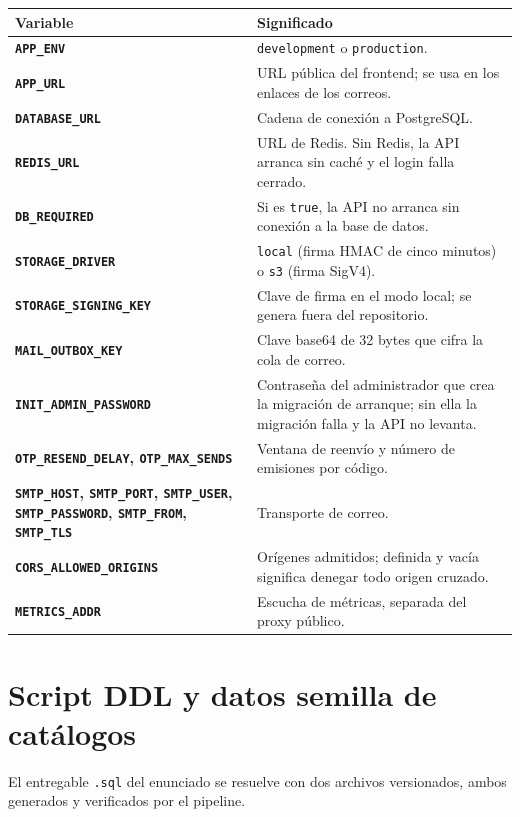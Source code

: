 \documentclass[11pt,a4paper]{article}
\newcommand{\code}[1]{\texttt{#1}}
\begin{document}
\begin{center}
\small
\begin{tabularx}{\textwidth}{@{}>{\bfseries\color{upseAzul}}p{4.8cm} X@{}}
\toprule
Variable & Significado \\
\midrule
\code{APP\_ENV} & \code{development} o \code{production}. \\
\code{APP\_URL} & URL p\'ublica del frontend; se usa en los enlaces de los correos. \\
\code{DATABASE\_URL} & Cadena de conexi\'on a PostgreSQL. \\
\code{REDIS\_URL} & URL de Redis. Sin Redis, la API arranca sin cach\'e y el login falla cerrado. \\
\code{DB\_REQUIRED} & Si es \code{true}, la API no arranca sin conexi\'on a la base de datos. \\
\code{STORAGE\_DRIVER} & \code{local} (firma HMAC de cinco minutos) o \code{s3} (firma SigV4). \\
\code{STORAGE\_SIGNING\_KEY} & Clave de firma en el modo local; se genera fuera del repositorio. \\
\code{MAIL\_OUTBOX\_KEY} & Clave base64 de 32 bytes que cifra la cola de correo. \\
\code{INIT\_ADMIN\_PASSWORD} & Contraseña del administrador que crea la migraci\'on de arranque; sin ella
la migraci\'on falla y la API no levanta. \\
\code{OTP\_RESEND\_DELAY}, \code{OTP\_MAX\_SENDS} & Ventana de reenv\'io y n\'umero de emisiones por
c\'odigo. \\
\code{SMTP\_HOST}, \code{SMTP\_PORT}, \code{SMTP\_USER}, \code{SMTP\_PASSWORD}, \code{SMTP\_FROM}, \code{SMTP\_TLS} & Transporte de correo. \\
\code{CORS\_ALLOWED\_ORIGINS} & Orígenes admitidos; definida y vac\'ia significa denegar todo origen cruzado. \\
\code{METRICS\_ADDR} & Escucha de m\'etricas, separada del proxy p\'ublico. \\
\bottomrule
\end{tabularx}
\end{center}

\section{Script DDL y datos semilla de cat\'alogos}\label{sec:ddl}

El entregable \code{.sql} del enunciado se resuelve con dos archivos versionados, ambos generados y
verificados por el pipeline.
\end{document}
